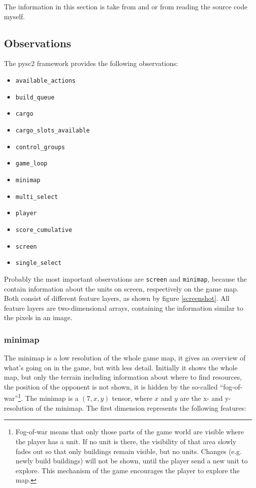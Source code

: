 \documentclass{article}
\begin{document}
The information in this section is take from \cite{Deepmind2017} and 
\cite{Blizzard2017} or from reading the source code myself.


\subsection{Observations}
The pysc2 framework provides the following observations:

\begin{itemize}[noitemsep]
\item \texttt{available\_actions}
\item \texttt{build\_queue}
\item \texttt{cargo}
\item \texttt{cargo\_slots\_available}
\item \texttt{control\_groups}
\item \texttt{game\_loop}
\item \texttt{minimap}
\item \texttt{multi\_select}
\item \texttt{player}
\item \texttt{score\_cumulative}
\item \texttt{screen}
\item \texttt{single\_select}
\end{itemize}

Probably the most important observations are \texttt{screen} and 
\texttt{minimap}, because the contain information about the units on screen, 
respectively on the game map. Both consist of different feature layers, as 
shown by figure \ref{screenshot}. All feature layers are two-dimensional 
arrays, containing the information similar to the pixels in an image.


\subsubsection{minimap}
The minimap is a low resolution of the whole game map, it gives an overview of 
what's going on in the game, but with less detail. Initially it shows the whole 
map, but only the terrain including information about where to find resources, 
the position of the opponent is not shown, it is hidden by the so-called 
``fog-of-war''\footnote{Fog-of-war means that only those parts of the game 
world are visible where the player has a unit. If no unit is there, the 
visibility of that area slowly fades out so that only buildings remain visible, 
but no units. Changes (e.g. newly build buildings) will not be shown, until the 
player send a new unit to explore. This mechanism of the game encourages the 
player to explore the map.}. The minimap is a $(7, x,y)$ tensor, where $x$ and 
$y$ are the x- and y-resolution of the minimap. The first dimension represents 
the following features:
\end{document}
